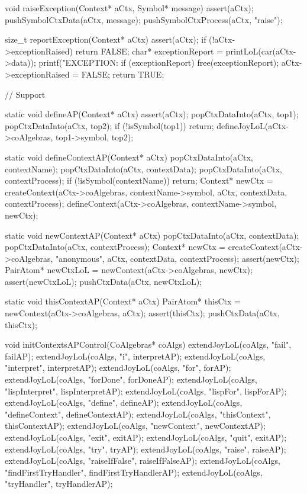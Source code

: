 void raiseException(Context* aCtx, Symbol* message) {
  assert(aCtx);
  pushSymbolCtxData(aCtx, message);
  pushSymbolCtxProcess(aCtx, "raise");
}

size_t reportException(Context* aCtx) {
  assert(aCtx);
  if (!aCtx->exceptionRaised) return FALSE;
  char* exceptionReport = printLoL(car(aCtx->data));
  printf("\nUNHANDLED EXCEPTION: %
  if (exceptionReport) free(exceptionReport);
  aCtx->exceptionRaised = FALSE;
  return TRUE;
}

// Support

static void defineAP(Context* aCtx) {
  assert(aCtx);
  popCtxDataInto(aCtx, top1);
  popCtxDataInto(aCtx, top2);
  if (!isSymbol(top1)) return;
  defineJoyLoL(aCtx->coAlgebras, top1->symbol, top2);
}

static void defineContextAP(Context* aCtx) {
  popCtxDataInto(aCtx, contextName);
  popCtxDataInto(aCtx, contextData);
  popCtxDataInto(aCtx, contextProcess);
  if (!isSymbol(contextName)) return;
  Context* newCtx =
    createContext(aCtx->coAlgebras, contextName->symbol,
                  aCtx, contextData, contextProcess);
  defineContext(aCtx->coAlgebras, contextName->symbol, newCtx);
}

static void newContextAP(Context* aCtx) {
  popCtxDataInto(aCtx, contextData);
  popCtxDataInto(aCtx, contextProcess);
  Context* newCtx =
    createContext(aCtx->coAlgebras, "anonymous",
                  aCtx, contextData, contextProcess);
  assert(newCtx);
  PairAtom* newCtxLoL = newContext(aCtx->coAlgebras, newCtx);
  assert(newCtxLoL);
  pushCtxData(aCtx, newCtxLoL);
}

static void thisContextAP(Context* aCtx) {
  PairAtom* thisCtx = newContext(aCtx->coAlgebras, aCtx);
  assert(thisCtx);
  pushCtxData(aCtx, thisCtx);
}

void initContextsAPControl(CoAlgebras* coAlgs) {
  extendJoyLoL(coAlgs, "fail",                failAP);
  extendJoyLoL(coAlgs, "i",                   interpretAP);
  extendJoyLoL(coAlgs, "interpret",           interpretAP);
  extendJoyLoL(coAlgs, "for",                 forAP);
  extendJoyLoL(coAlgs, "forDone",             forDoneAP);
  extendJoyLoL(coAlgs, "lispInterpret",       lispInterpretAP);
  extendJoyLoL(coAlgs, "lispFor",             lispForAP);
  extendJoyLoL(coAlgs, "define",              defineAP);
  extendJoyLoL(coAlgs, "defineContext",       defineContextAP);
  extendJoyLoL(coAlgs, "thisContext",         thisContextAP);
  extendJoyLoL(coAlgs, "newContext",          newContextAP);
  extendJoyLoL(coAlgs, "exit",                exitAP);
  extendJoyLoL(coAlgs, "quit",                exitAP);
  extendJoyLoL(coAlgs, "try",                 tryAP);
  extendJoyLoL(coAlgs, "raise",               raiseAP);
  extendJoyLoL(coAlgs, "raiseIfFalse",        raiseIfFalseAP);
  extendJoyLoL(coAlgs, "findFirstTryHandler", findFirstTryHandlerAP);
  extendJoyLoL(coAlgs, "tryHandler",          tryHandlerAP);
}
\stoptyping

